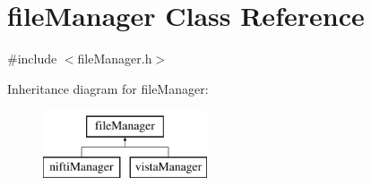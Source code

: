 \hypertarget{classfileManager}{\section{file\-Manager \-Class \-Reference}
\label{classfileManager}
}


{\ttfamily \#include $<$file\-Manager.\-h$>$}

\-Inheritance diagram for file\-Manager\-:\begin{figure}[H]
\begin{center}
\leavevmode
\includegraphics[height=2.000000cm]{classfileManager}
\end{center}
\end{figure}
